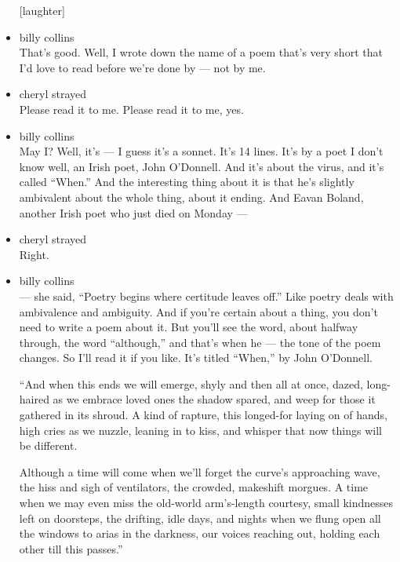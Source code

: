 \begin{itemize}
  {[}laughter{]}
\item
  billy collins\\
  That's good. Well, I wrote down the name of a poem that's very short
  that I'd love to read before we're done by --- not by me.
\item
  cheryl strayed\\
  Please read it to me. Please read it to me, yes.
\item
  billy collins\\
  May I? Well, it's --- I guess it's a sonnet. It's 14 lines. It's by a
  poet I don't know well, an Irish poet, John O'Donnell. And it's about
  the virus, and it's called ``When.'' And the interesting thing about
  it is that he's slightly ambivalent about the whole thing, about it
  ending. And Eavan Boland, another Irish poet who just died on Monday
  ---
\item
  cheryl strayed\\
  Right.
\item
  billy collins\\
  --- she said, ``Poetry begins where certitude leaves off.'' Like
  poetry deals with ambivalence and ambiguity. And if you're certain
  about a thing, you don't need to write a poem about it. But you'll see
  the word, about halfway through, the word ``although,'' and that's
  when he --- the tone of the poem changes. So I'll read it if you like.
  It's titled ``When,'' by John O'Donnell.

  ``And when this ends we will emerge, shyly and then all at once,
  dazed, long-haired as we embrace loved ones the shadow spared, and
  weep for those it gathered in its shroud. A kind of rapture, this
  longed-for laying on of hands, high cries as we nuzzle, leaning in to
  kiss, and whisper that now things will be different.

  Although a time will come when we'll forget the curve's approaching
  wave, the hiss and sigh of ventilators, the crowded, makeshift
  morgues. A time when we may even miss the old-world arm's-length
  courtesy, small kindnesses left on doorsteps, the drifting, idle days,
  and nights when we flung open all the windows to arias in the
  darkness, our voices reaching out, holding each other till this
  passes.''


\end{itemize}
